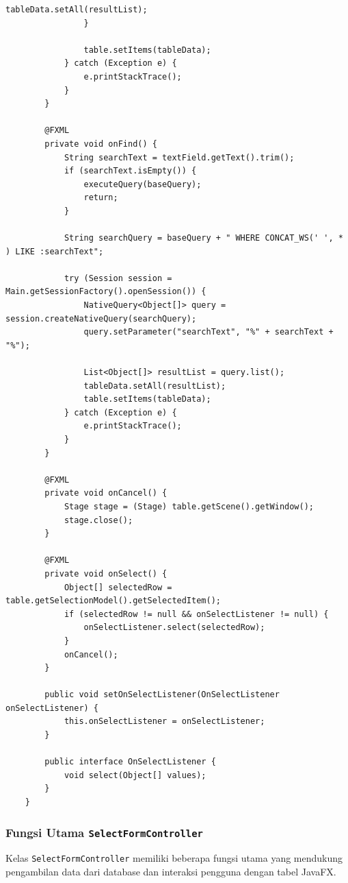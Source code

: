 \begin{lstlisting}[style=JavaStyle]
					tableData.setAll(resultList);
				}
				
				table.setItems(tableData);
			} catch (Exception e) {
				e.printStackTrace();
			}
		}
		
		@FXML
		private void onFind() {
			String searchText = textField.getText().trim();
			if (searchText.isEmpty()) {
				executeQuery(baseQuery);
				return;
			}
			
			String searchQuery = baseQuery + " WHERE CONCAT_WS(' ', * ) LIKE :searchText";
			
			try (Session session = Main.getSessionFactory().openSession()) {
				NativeQuery<Object[]> query = session.createNativeQuery(searchQuery);
				query.setParameter("searchText", "%" + searchText + "%");
				
				List<Object[]> resultList = query.list();
				tableData.setAll(resultList);
				table.setItems(tableData);
			} catch (Exception e) {
				e.printStackTrace();
			}
		}
		
		@FXML
		private void onCancel() {
			Stage stage = (Stage) table.getScene().getWindow();
			stage.close();
		}
		
		@FXML
		private void onSelect() {
			Object[] selectedRow = table.getSelectionModel().getSelectedItem();
			if (selectedRow != null && onSelectListener != null) {
				onSelectListener.select(selectedRow);
			}
			onCancel();
		}
		
		public void setOnSelectListener(OnSelectListener onSelectListener) {
			this.onSelectListener = onSelectListener;
		}
		
		public interface OnSelectListener {
			void select(Object[] values);
		}
	}
\end{lstlisting}

\subsubsection{Fungsi Utama \texttt{SelectFormController}}

Kelas \texttt{SelectFormController} memiliki beberapa fungsi utama yang mendukung pengambilan data dari database dan interaksi pengguna dengan tabel JavaFX.

